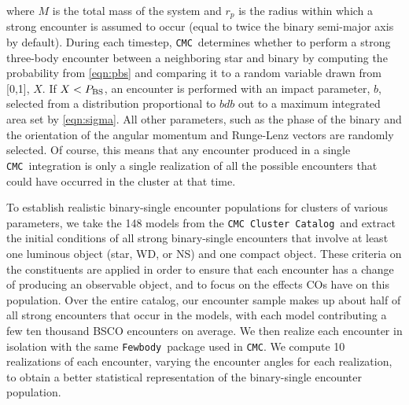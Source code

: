 \documentclass[twocolumn]{aastex631}
\newcommand{\CMC}{\texttt{CMC}}
\newcommand{\CMCcat}{\texttt{CMC Cluster Catalog}}
\newcommand{\fewbody}{\texttt{Fewbody}}
\begin{document}
\noindent where $M$ is the total mass of the system and $r_p$ is the radius within which a strong encounter is assumed to occur (equal to twice the binary semi-major axis by default).  
During each timestep, \CMC\ determines whether to perform a strong three-body encounter between a neighboring star and binary by computing the probability from \ref{eqn:pbs} and comparing it to a random variable drawn from [0,1], $X$.  If $X < P_{\rm BS}$, an encounter is performed with an impact parameter, $b$, selected from a distribution proportional to $b db$ out to a maximum integrated area set by \ref{eqn:sigma}.  All other parameters, such as the phase of the binary and the orientation of the angular momentum and Runge-Lenz vectors are randomly selected.  Of course, this means that any encounter produced in a single \CMC\ integration is only a single realization of all the possible encounters that could have occurred in the cluster at that time.   %

To establish realistic binary-single encounter populations for clusters of various parameters, we take the 148 models from the \CMCcat\ and extract the initial conditions of all strong binary-single encounters that involve at least one luminous object (star, WD, or NS) and one compact object.
These criteria on the constituents are applied in order to ensure that each encounter has a change of producing an observable object, and to focus on the effects COs have on this population.
Over the entire catalog, our encounter sample makes up about half of all strong encounters that occur in the models, with each model contributing a few ten thousand BSCO encounters on average.
We then realize each encounter in isolation with the same \fewbody\ package used in \CMC.
We compute 10 realizations of each encounter, varying the encounter angles for each realization, to obtain a better statistical representation of the binary-single encounter population.
\end{document}
